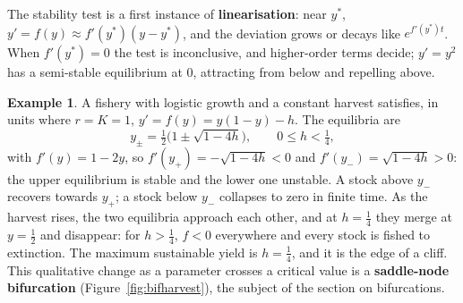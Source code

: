 \documentclass[11pt,a4paper]{article}
\numberwithin{equation}{section}
\theoremstyle{definition}
\newtheorem{exa}[thm]{Example}
\begin{document}
The stability test is a first instance of \textbf{linearisation}: near $y^*$, $y' = f(y) \approx f'(y^*)(y - y^*)$, and the deviation grows or decays like $e^{f'(y^*)t}$. When $f'(y^*) = 0$ the test
is inconclusive, and higher-order terms decide; $y' = y^2$ has a semi-stable equilibrium at $0$, attracting from below and repelling above.

\begin{exa}
\label{ex:harvest}
A fishery with logistic growth and a constant harvest satisfies, in units where $r = K = 1$, $y' = f(y) = y(1 - y) - h$. The equilibria are
\[
y_\pm = \tfrac12\bigl(1 \pm \sqrt{1 - 4h}\bigr), \qquad 0 \leq h < \tfrac14 ,
\]
with $f'(y) = 1 - 2y$, so $f'(y_+) = -\sqrt{1 - 4h} < 0$ and $f'(y_-) = \sqrt{1 - 4h} > 0$: the upper equilibrium is stable and the lower one unstable. A stock above $y_-$ recovers
towards $y_+$; a stock below $y_-$ collapses to zero in finite time. As the harvest rises, the two equilibria approach each other, and at $h = \frac14$ they merge
at $y = \frac12$ and disappear: for $h > \frac14$, $f < 0$ everywhere and every stock is fished to extinction. The maximum sustainable yield is $h = \frac14$, and it is
the edge of a cliff. This qualitative change as a parameter crosses a critical value is a \textbf{saddle-node bifurcation} (Figure~\ref{fig:bifharvest}), the subject of
the section on bifurcations.
\end{exa}
\end{document}
